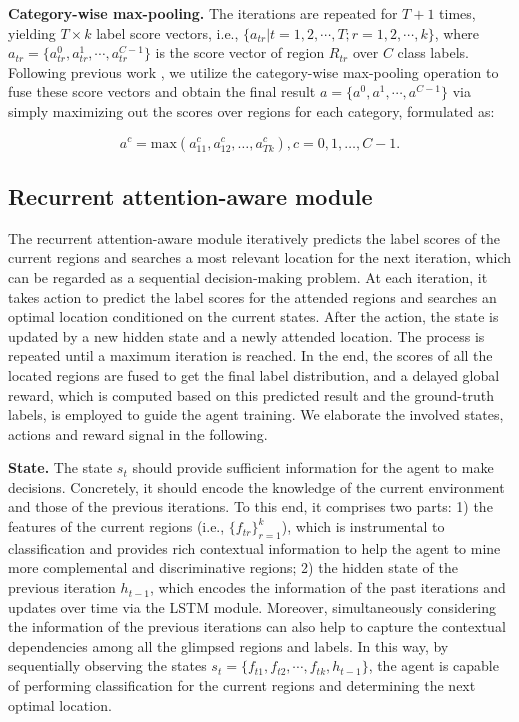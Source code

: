 \documentclass[letterpaper]{article} %
\begin{document}
\noindent\textbf{Category-wise max-pooling.} The iterations are repeated for $T+1$ times, yielding $T\times{k}$ label score vectors, i.e., $\{a_{tr}|t=1,2,\cdots,T; r=1,2,\cdots,k\}$, where $a_{tr}=\{a_{tr}^{0},a_{tr}^{1},\cdots,a_{tr}^{C-1}\}$ is the score vector of region $R_{tr}$ over $C$ class labels. Following previous work \cite{wei2016hcp}, we utilize the category-wise max-pooling operation to fuse these score vectors and obtain the final result $a=\{a^0,a^1,\cdots,a^{C-1}\}$ via simply maximizing out the scores over regions for each category, formulated as:

 \begin{equation}
      a^c=\mathrm{max}(a_{11}^c,a_{12}^c,\dots,a_{Tk}^c), c=0,1,\dots,C-1.
\end{equation}

\subsection{Recurrent attention-aware module}
The recurrent attention-aware module iteratively predicts the label scores of the current regions and searches a most relevant location for the next iteration, which can be regarded as a sequential decision-making problem. At each iteration, it takes action to predict the label scores for the attended regions and searches an optimal location conditioned on the current states. After the action, the state is updated by a new hidden state and a newly attended location. The process is repeated until a maximum iteration is reached. In the end, the scores of all the located regions are fused to get the final label distribution, and a delayed global reward, which is computed based on this predicted result and the ground-truth labels, is employed to guide the agent training. We elaborate the involved states, actions and reward signal in the following.

\noindent\textbf{State.} The state $s_t$ should provide sufficient information for the agent to make decisions. Concretely, it should encode the knowledge of the current environment and those of the previous iterations. To this end, it comprises two parts: 1) the features of the current regions (i.e., $\{f_{tr}\}_{r=1}^k$), which is instrumental to classification and provides rich contextual information to help the agent to mine more complemental and discriminative regions; 2) the hidden state of the previous iteration $h_{t-1}$, which encodes the information of the past iterations and updates over time via the LSTM module. Moreover, simultaneously considering the information of the previous iterations can also help to capture the contextual dependencies among all the glimpsed regions and labels. In this way, by sequentially observing the states $s_t=\{f_{t1}, f_{t2}, \cdots, f_{tk}, h_{t-1}\}$, the agent is capable of performing classification for the current regions and determining the next optimal location.
\end{document}
